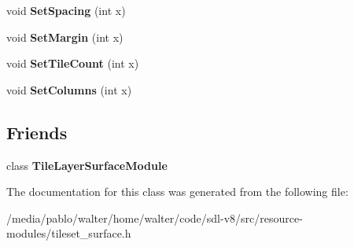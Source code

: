\begin{DoxyCompactItemize}
void {\bfseries Set\+Spacing} (int x)
\item 
\mbox{\label{classTileSetSurfaceModule_a04fe5cdafcc58dc7587a325c2d34246a}} 
void {\bfseries Set\+Margin} (int x)
\item 
\mbox{\label{classTileSetSurfaceModule_ae8967d5e0f6f4abfb0f17708f4b3e57a}} 
void {\bfseries Set\+Tile\+Count} (int x)
\item 
\mbox{\label{classTileSetSurfaceModule_ab2ae4b092e31fb32568a9e19b180c2cf}} 
void {\bfseries Set\+Columns} (int x)
\end{DoxyCompactItemize}
\subsection*{Friends}
\begin{DoxyCompactItemize}
\item 
\mbox{\label{classTileSetSurfaceModule_a4ad423596edd9a5bbd9c0bad1258180d}} 
class {\bfseries Tile\+Layer\+Surface\+Module}
\end{DoxyCompactItemize}


The documentation for this class was generated from the following file\+:\begin{DoxyCompactItemize}
\item 
/media/pablo/walter/home/walter/code/sdl-\/v8/src/resource-\/modules/tileset\+\_\+surface.\+h\end{DoxyCompactItemize}
